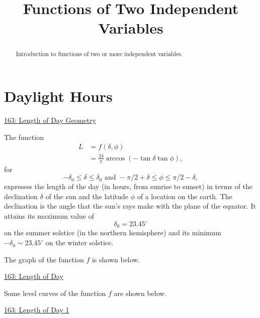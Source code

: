 \documentclass{ximera}
\title{Functions of Two Independent Variables}
\begin{document}
\begin{abstract}
Introduction to functions of two or more independent variables.
\end{abstract}
\maketitle


\section{Daylight Hours}


\begin{example} \label{Edft45346t34}
\begin{onlineOnly}
    \begin{center}
\end{center}
\end{onlineOnly}

\href{https://www.desmos.com/3d/jhuok4umw3}{163: Length of Day Geometry}



The function
\begin{align*}
      L &= f(\delta, \phi) \\
         & = \frac{24}{\pi}\arccos\left( -\tan \delta \tan \phi  \right) , 
\end{align*}
for
\[
             -\delta_0 \leq \delta \leq \delta_0 \text{ and } -\pi/2+\delta \leq \phi \leq \pi/2-\delta ,
\]
expresses the length of the day (in hours, from sunrise to sunset) in terms of the declination $\delta$ of the sun and the latitude $\phi$ of a location on the earth. The declination is the angle that the sun's rays make with the plane of the equator. It attains its maximum value of 
\[
   \delta_0 = 23.45^\circ
\]
on the summer solstice (in the northern hemisphere) and its minimum $-\delta_0 \sim 23.45^\circ$ on the winter solstice.

The graph of the function $f$ is shown below.

\begin{onlineOnly}
    \begin{center}
\end{center}
\end{onlineOnly}

\href{https://www.desmos.com/3d/kzyp9rm9i2}{163: Length of Day}


Some level curves of the function $f$ are shown below.

\begin{onlineOnly}
    \begin{center}
\end{center}
\end{onlineOnly}

\href{https://www.desmos.com/calculator/ub47uf52hj}{163: Length of Day 1}



\end{example}
\end{document}
